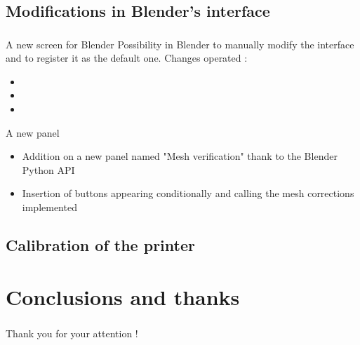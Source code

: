 \documentclass{beamer}
\begin{document}
\subsection{Modifications in Blender's interface}
\begin{frame}
	\frametitle{}

    \begin{block}{A new screen for Blender}
Possibility in Blender to manually modify the interface and to register it as the default one.
Changes operated :
	\begin{itemize}
	\item 
	\item
	\item
	\end{itemize}
    \end{block}
    
    \begin{block}{A new panel}
    \begin{itemize}
	\item Addition on a new panel named "Mesh verification" thank to the Blender Python API
	\item Insertion of buttons appearing conditionally and calling the mesh corrections implemented
	\end{itemize}
    \end{block}
\end{frame}

\subsection{Calibration of the printer}
\begin{frame}
	\frametitle{}

    \begin{block}{}
    \end{block}
\end{frame}

\section{Conclusions and thanks}
\begin{frame}
	\frametitle{}

    \begin{block}{}
    \end{block}
\end{frame}

\begin{frame}
	\frametitle{}

    \begin{center}
    \Large{Thank you for your attention !}
    \end{center}
\end{frame}
	
\end{document}
